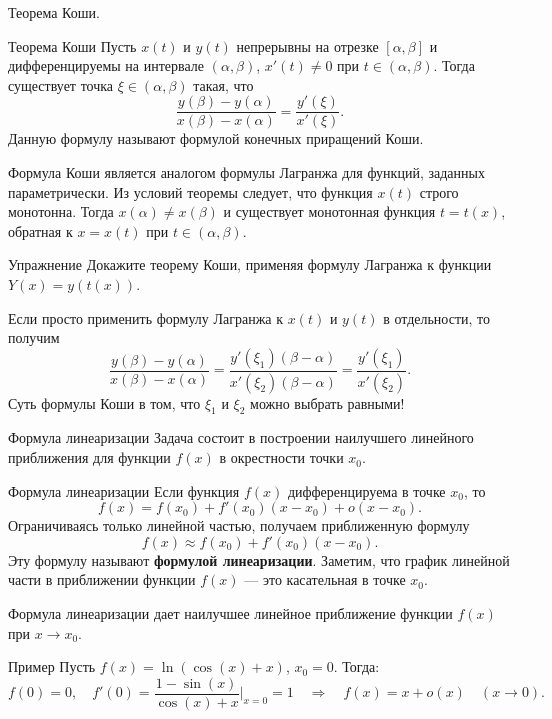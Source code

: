 \documentclass[8pt]{beamer}
\begin{document}
\begin{frame}{Теорема Коши.}
\begin{block}{Теорема Коши}
Пусть $x(t)$ и $y(t)$ непрерывны на отрезке $[\alpha,\beta]$ и дифференцируемы на интервале $(\alpha,\beta)$, $x'(t)\ne0$ при $t\in(\alpha,\beta)$. Тогда существует точка $\xi\in(\alpha,\beta)$ такая, что
$$\frac{y(\beta)-y(\alpha)}{x(\beta)-x(\alpha)} = \frac{y'(\xi)}{x'(\xi)}.$$
Данную формулу называют формулой конечных приращений Коши.
\end{block} 
Формула Коши является аналогом формулы Лагранжа для функций, заданных параметрически. Из условий теоремы следует, что функция $x(t)$ строго монотонна. Тогда $x(\alpha)\ne x(\beta)$ и существует монотонная функция $t=t(x)$, обратная к $x=x(t)$ при $t\in(\alpha,\beta)$. 
\begin{block}{Упражнение}
Докажите теорему Коши, применяя формулу Лагранжа к функции $Y(x)=y(t(x))$.
\end{block}
Если просто применить формулу Лагранжа к $x(t)$ и $y(t)$ в отдельности, то получим
$$\frac{y(\beta)-y(\alpha)}{x(\beta)-x(\alpha)} = \frac{y'(\xi_1)(\beta-\alpha)}{x'(\xi_2)(\beta-\alpha)}=\frac{y'(\xi_1)}{x'(\xi_2)}.$$
Суть формулы Коши в том, что $\xi_1$ и $\xi_2$ можно выбрать равными!
\end{frame}

\begin{frame}{Формула линеаризации}
Задача состоит в построении наилучшего линейного приближения для функции $f(x)$ в окрестности точки $x_0$.
\begin{block}{Формула линеаризации}
Если функция $f(x)$ дифференцируема в точке $x_0$, то
$$f(x)=f(x_0)+f'(x_0)(x-x_0)+o(x-x_0).$$
Ограничиваясь только линейной частью, получаем приближенную формулу
$$f(x)\approx f(x_0)+f'(x_0)(x-x_0).$$
Эту формулу называют {\bf формулой линеаризации}. Заметим, что график линейной части в приближении функции $f(x)$ --- это касательная в точке $x_0$.
\end{block}
Формула линеаризации дает наилучшее линейное приближение функции $f(x)$ при $x\to x_0$.
\begin{block}{Пример}
Пусть $f(x) = \ln(\cos(x)+x)$, $x_0=0$. Тогда:
$$f(0) = 0,\quad f'(0)  =\frac{1-\sin(x)}{\cos(x)+x}\Big|_{x=0} = 1
\quad\Rightarrow\quad 
f(x) = x + o(x)\quad (x\to0).$$
\end{block} 
\end{frame}
\end{document}
